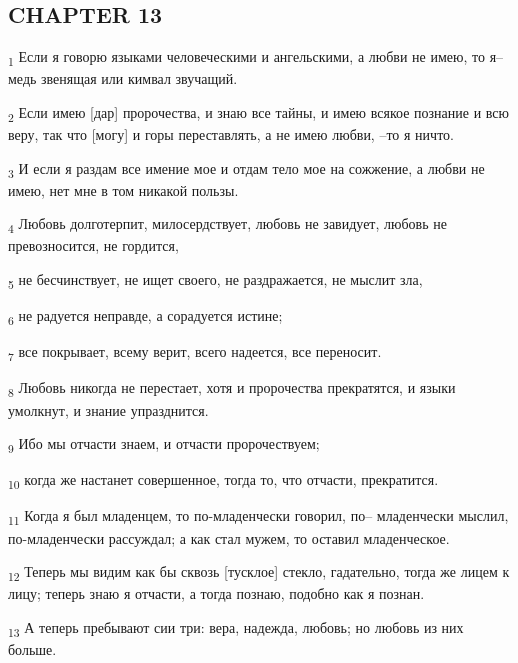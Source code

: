 \subsection{CHAPTER 13}
\begin{tcolorbox}
\textsubscript{1} Если я говорю языками человеческими и ангельскими, а любви не имею, то я--медь звенящая или кимвал звучащий.
\end{tcolorbox}
\begin{tcolorbox}
\textsubscript{2} Если имею [дар] пророчества, и знаю все тайны, и имею всякое познание и всю веру, так что [могу] и горы переставлять, а не имею любви, --то я ничто.
\end{tcolorbox}
\begin{tcolorbox}
\textsubscript{3} И если я раздам все имение мое и отдам тело мое на сожжение, а любви не имею, нет мне в том никакой пользы.
\end{tcolorbox}
\begin{tcolorbox}
\textsubscript{4} Любовь долготерпит, милосердствует, любовь не завидует, любовь не превозносится, не гордится,
\end{tcolorbox}
\begin{tcolorbox}
\textsubscript{5} не бесчинствует, не ищет своего, не раздражается, не мыслит зла,
\end{tcolorbox}
\begin{tcolorbox}
\textsubscript{6} не радуется неправде, а сорадуется истине;
\end{tcolorbox}
\begin{tcolorbox}
\textsubscript{7} все покрывает, всему верит, всего надеется, все переносит.
\end{tcolorbox}
\begin{tcolorbox}
\textsubscript{8} Любовь никогда не перестает, хотя и пророчества прекратятся, и языки умолкнут, и знание упразднится.
\end{tcolorbox}
\begin{tcolorbox}
\textsubscript{9} Ибо мы отчасти знаем, и отчасти пророчествуем;
\end{tcolorbox}
\begin{tcolorbox}
\textsubscript{10} когда же настанет совершенное, тогда то, что отчасти, прекратится.
\end{tcolorbox}
\begin{tcolorbox}
\textsubscript{11} Когда я был младенцем, то по-младенчески говорил, по-- младенчески мыслил, по-младенчески рассуждал; а как стал мужем, то оставил младенческое.
\end{tcolorbox}
\begin{tcolorbox}
\textsubscript{12} Теперь мы видим как бы сквозь [тусклое] стекло, гадательно, тогда же лицем к лицу; теперь знаю я отчасти, а тогда познаю, подобно как я познан.
\end{tcolorbox}
\begin{tcolorbox}
\textsubscript{13} А теперь пребывают сии три: вера, надежда, любовь; но любовь из них больше.
\end{tcolorbox}
